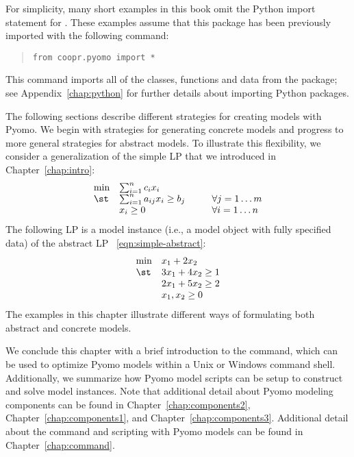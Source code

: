 \begin{Xnotebox}
For simplicity, many short examples in this book omit the Python import statement for .  These examples assume that this package has been previously imported with the following command:
\begin{quote}
\begin{lstlisting}[frame=none]
from coopr.pyomo import *
\end{lstlisting}
\end{quote}
This command imports all of the classes, functions and data from the  package;  see Appendix~\ref{chap:python} for further details about 
importing Python packages.
\end{Xnotebox}

The following sections describe different strategies for creating
models with Pyomo.  We begin with strategies for generating concrete
models and progress to more general strategies for abstract models.
To illustrate this flexibility, we consider a generalization of the 
simple LP that we introduced in Chapter~\ref{chap:intro}:
\begin{equation}
\label{eqn:simple-abstract}
\begin{array}{lll}
\min & \sum_{i=1}^n c_i x_i &\\
\st & \sum_{i=1}^n a_{ij} x_i \geq b_j \hspace{0.25in} & \forall j = 1 \ldots m\\
    & x_i \geq 0 & \forall i = 1 \ldots n
\end{array}
\end{equation}
The following LP is a model instance (i.e., a model object with fully specified data) of the abstract LP ~\ref{eqn:simple-abstract}:
\begin{equation}
\label{eqn:simple-concrete}
\begin{array}{ll}
\min & x_1 + 2 x_2\\
\st & 3 x_1 + 4 x_2 \geq 1\\
    & 2 x_1 + 5 x_2 \geq 2\\
    & x_1, x_2 \geq 0
\end{array}
\end{equation}
The examples in this chapter illustrate different ways of formulating both
abstract and concrete models.

We conclude this chapter with a brief introduction to the 
command, which can be used to optimize Pyomo models within a Unix or
Windows command shell.  Additionally, we summarize how Pyomo model
scripts can be setup to construct and solve model instances.  Note that
additional detail about Pyomo modeling components can be found in
Chapter~\ref{chap:components2}, Chapter~\ref{chap:components1}, and Chapter~\ref{chap:components3}.  Additional detail
about the  command and scripting with Pyomo models can be
found in Chapter~\ref{chap:command}.


